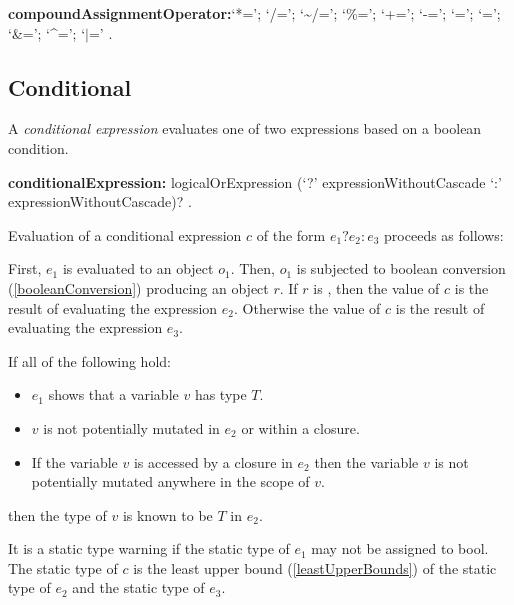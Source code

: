 \documentclass{article}
\newcommand{\code}[1]{{\sf #1}}
\begin{document}
\begin{grammar}
{\bf compoundAssignmentOperator:}`*=';
      `/=';
      `\~{}/=';
      `\%=';
      `+=';
      `-=';
      `{\escapegrammar \lt \lt}=';
       `{\escapegrammar \gt \gt}=';
      `\&=';
      `\^{}=';
      `$|$='
    .
\end{grammar}

    
\subsection{ Conditional}

\LMHash{}
A {\em conditional expression} evaluates one of two expressions based on a boolean condition.

\begin{grammar}
  {\bf conditionalExpression:}
     logicalOrExpression (`?' expressionWithoutCascade `{\escapegrammar :}' expressionWithoutCascade)?
    . %
\end{grammar}

\LMHash{}
Evaluation of a conditional expression $c$ of the form $e_1 ? e_2 : e_3$ proceeds as follows:

\LMHash{}
First, $e_1$ is evaluated to an object $o_1$.  Then, $o_1$ is  subjected to boolean conversion (\ref{booleanConversion}) producing an object $r$.  If $r$ is \TRUE, then the value of $c$ is the result of evaluating the expression $e_2$. Otherwise the value of $c$ is the result of evaluating the expression $e_3$. 

\LMHash{}
If all of the following hold:
\begin{itemize}
\item $e_1$ shows that a variable $v$ has type $T$.
\item $v$ is not potentially mutated in $e_2$ or within a closure.
\item If the variable $v$ is accessed by a closure in $e_2$ then the variable $v$ is not potentially mutated anywhere in the scope of $v$.
\end{itemize}

then the type of $v$ is known to be $T$ in $e_2$.


\LMHash{}
 It is a static type warning if the static type of $e_1$ may not be assigned to \code{bool}.  The static type of $c$ is the least upper bound (\ref{leastUpperBounds}) of the static type of $e_2$ and the static type of $e_3$.
  
\end{document}
